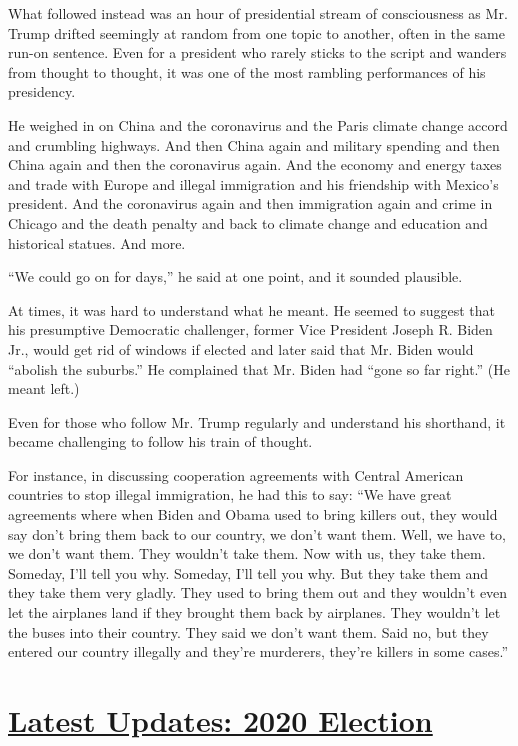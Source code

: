 What followed instead was an hour of presidential stream of
consciousness as Mr. Trump drifted seemingly at random from one topic to
another, often in the same run-on sentence. Even for a president who
rarely sticks to the script and wanders from thought to thought, it was
one of the most rambling performances of his presidency.

He weighed in on China and the coronavirus and the Paris climate change
accord and crumbling highways. And then China again and military
spending and then China again and then the coronavirus again. And the
economy and energy taxes and trade with Europe and illegal immigration
and his friendship with Mexico's president. And the coronavirus again
and then immigration again and crime in Chicago and the death penalty
and back to climate change and education and historical statues. And
more.

``We could go on for days,'' he said at one point, and it sounded
plausible.

At times, it was hard to understand what he meant. He seemed to suggest
that his presumptive Democratic challenger, former Vice President Joseph
R. Biden Jr., would get rid of windows if elected and later said that
Mr. Biden would ``abolish the suburbs.'' He complained that Mr. Biden
had ``gone so far right.'' (He meant left.)

Even for those who follow Mr. Trump regularly and understand his
shorthand, it became challenging to follow his train of thought.

For instance, in discussing cooperation agreements with Central American
countries to stop illegal immigration, he had this to say: ``We have
great agreements where when Biden and Obama used to bring killers out,
they would say don't bring them back to our country, we don't want them.
Well, we have to, we don't want them. They wouldn't take them. Now with
us, they take them. Someday, I'll tell you why. Someday, I'll tell you
why. But they take them and they take them very gladly. They used to
bring them out and they wouldn't even let the airplanes land if they
brought them back by airplanes. They wouldn't let the buses into their
country. They said we don't want them. Said no, but they entered our
country illegally and they're murderers, they're killers in some
cases.''

\hypertarget{latest-updates-2020-election}{%
\section{\texorpdfstring{\href{https://www.nytimes.com/2020/08/03/us/elections/biden-vs-trump.html?action=click\&pgtype=Article\&state=default\&region=MAIN_CONTENT_1\&context=storylines_live_updates}{Latest
Updates: 2020
Election}}{Latest Updates: 2020 Election}}\label{latest-updates-2020-election}}

